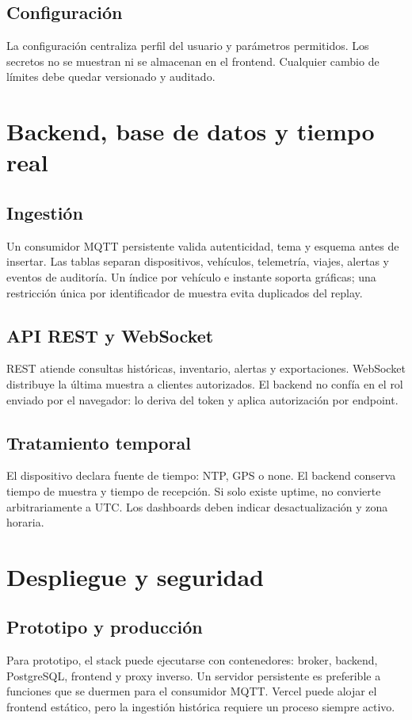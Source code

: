 \documentclass[11pt,a4paper,oneside]{report}
\begin{document}
\section{Configuración}

La configuración centraliza perfil del usuario y parámetros permitidos. Los secretos
no se muestran ni se almacenan en el frontend. Cualquier cambio de límites debe quedar
versionado y auditado.

\chapter{Backend, base de datos y tiempo real}

\section{Ingestión}
Un consumidor MQTT persistente valida autenticidad, tema y esquema antes de insertar.
Las tablas separan dispositivos, vehículos, telemetría, viajes, alertas y eventos de
auditoría. Un índice por vehículo e instante soporta gráficas; una restricción única por
identificador de muestra evita duplicados del replay.

\section{API REST y WebSocket}
REST atiende consultas históricas, inventario, alertas y exportaciones. WebSocket
distribuye la última muestra a clientes autorizados. El backend no confía en el rol
enviado por el navegador: lo deriva del token y aplica autorización por endpoint.

\section{Tratamiento temporal}
El dispositivo declara fuente de tiempo: NTP, GPS o none. El backend conserva tiempo
de muestra y tiempo de recepción. Si solo existe uptime, no convierte arbitrariamente
a UTC. Los dashboards deben indicar desactualización y zona horaria.

\chapter{Despliegue y seguridad}

\section{Prototipo y producción}
Para prototipo, el stack puede ejecutarse con contenedores: broker, backend, PostgreSQL,
frontend y proxy inverso. Un servidor persistente es preferible a funciones que se
duermen para el consumidor MQTT. Vercel puede alojar el frontend estático, pero la
ingestión histórica requiere un proceso siempre activo.
\end{document}
